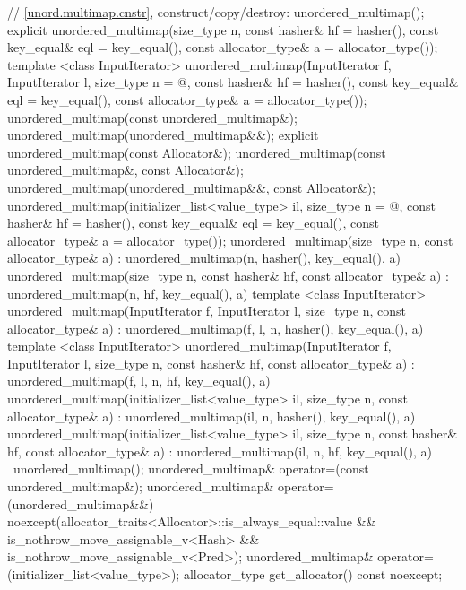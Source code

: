 \begin{codeblock}
{{    // \ref{unord.multimap.cnstr}, construct/copy/destroy:
    unordered_multimap();
    explicit unordered_multimap(size_type n,
                                const hasher& hf = hasher(),
                                const key_equal& eql = key_equal(),
                                const allocator_type& a = allocator_type());
    template <class InputIterator>
      unordered_multimap(InputIterator f, InputIterator l,
                         size_type n = @\seebelow@,
                         const hasher& hf = hasher(),
                         const key_equal& eql = key_equal(),
                         const allocator_type& a = allocator_type());
    unordered_multimap(const unordered_multimap&);
    unordered_multimap(unordered_multimap&&);
    explicit unordered_multimap(const Allocator&);
    unordered_multimap(const unordered_multimap&, const Allocator&);
    unordered_multimap(unordered_multimap&&, const Allocator&);
    unordered_multimap(initializer_list<value_type> il,
                       size_type n = @\seebelow@,
                       const hasher& hf = hasher(),
                       const key_equal& eql = key_equal(),
                       const allocator_type& a = allocator_type());
    unordered_multimap(size_type n, const allocator_type& a)
      : unordered_multimap(n, hasher(), key_equal(), a) { }
    unordered_multimap(size_type n, const hasher& hf, const allocator_type& a)
      : unordered_multimap(n, hf, key_equal(), a) { }
    template <class InputIterator>
      unordered_multimap(InputIterator f, InputIterator l, size_type n, const allocator_type& a)
        : unordered_multimap(f, l, n, hasher(), key_equal(), a) { }
    template <class InputIterator>
      unordered_multimap(InputIterator f, InputIterator l, size_type n, const hasher& hf, 
                         const allocator_type& a)
        : unordered_multimap(f, l, n, hf, key_equal(), a) { }
    unordered_multimap(initializer_list<value_type> il, size_type n, const allocator_type& a)
      : unordered_multimap(il, n, hasher(), key_equal(), a) { }
    unordered_multimap(initializer_list<value_type> il, size_type n, const hasher& hf, 
                       const allocator_type& a)
      : unordered_multimap(il, n, hf, key_equal(), a) { }
    ~unordered_multimap();
    unordered_multimap& operator=(const unordered_multimap&);
    unordered_multimap& operator=(unordered_multimap&&)
      noexcept(allocator_traits<Allocator>::is_always_equal::value &&
               is_nothrow_move_assignable_v<Hash> &&
               is_nothrow_move_assignable_v<Pred>);
    unordered_multimap& operator=(initializer_list<value_type>);
    allocator_type get_allocator() const noexcept;

}}
\end{codeblock}

